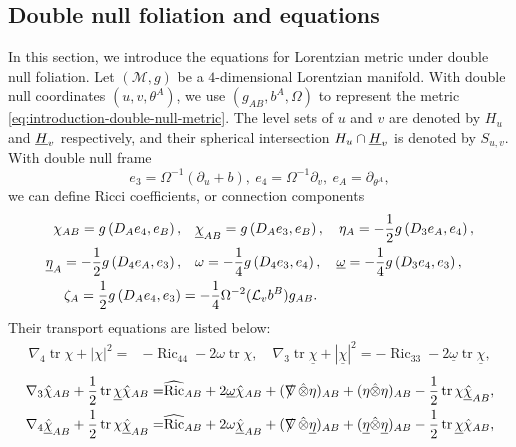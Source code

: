 \subsection{Double null foliation and equations}
In this section, we introduce the equations for Lorentzian metric under double null foliation. Let $(\mathcal{M},g)$ be a $4$-dimensional Lorentzian manifold. With double null coordinates $(u,v,\theta^A)$, we use $(g_{AB},b^A,\Omega)$ to represent the metric \eqref{eq:introduction-double-null-metric}. The level sets of $u$ and $v$ are denoted by $H_u$ and $\underline H_{v}$ respectively, and their spherical intersection $H_u\cap\underline H_v$ is denoted by $S_{u,v}$.
With double null frame 
\[e_3=\Omega^{-1}(\partial_u+b),\ e_4=\Omega^{-1}\partial_v,\ e_A=\partial_{\theta^A},\]
we can define Ricci coefficients, or connection components
\begin{equation}\label{Ricci_coefficients_definition}
    \begin{aligned}
    \chi_{A B}=g\left(D_A e_4, e_B\right), &\quad \underline{\chi}_{A B}=g\left(D_A e_3, e_B\right), \quad
    \eta_A=-\frac{1}{2} g\left(D_3 e_A, e_4\right),\\
    \underline{\eta}_A=-\frac{1}{2} g\left(D_4 e_A, e_3\right),&\quad 
    {\omega}=-\frac{1}{4} g\left(D_4 e_3, e_4\right), \quad \underline{\omega}=-\frac{1}{4} g\left(D_3 e_4, e_3\right),\\
    \zeta_A=\frac{1}{2}g\left(D_A e_4,e_3\right)&=-\frac{1}{4}\Omega^{-2}(\mathcal L_vb^B)g_{AB}.
    \end{aligned}
\end{equation}
Their transport equations are listed below:
\begin{equation}\label{eq:Ricci_coefficients_propagation_1}
    \begin{aligned}
        \nabla_4 \operatorname{tr} \chi+|{\chi}|^2 =&-\operatorname{Ric}_{44}-2 \omega \operatorname{tr} \chi, \quad 
     \nabla_3 \operatorname{tr} \underline{\chi}+|\underline{{\chi}}|^2 =-\operatorname{Ric}_{33}-2 \underline{\omega} \operatorname{tr} \underline{\chi},
    \end{aligned}
\end{equation}
\begin{equation}\label{eq:Ricci_coefficients_propagation_2}
    \begin{aligned}
        \nabla_3 \hat{\chi}_{A B}+\frac{1}{2} \operatorname{tr} \underline{\chi} \hat{\chi}_{A B}=&\widehat{\operatorname{Ric}}_{A B}+2 \underline{\omega} \hat{\chi}_{A B}+(\nabla\mkern-13mu /\,\,  \hat{\otimes} \eta)_{A B}+(\eta \hat{\otimes} \eta)_{A B}-\frac{1}{2} \operatorname{tr} \chi \underline{\hat{\chi}}_{A B}, \\
     \nabla_4 \underline{\hat{\chi}}_{A B}+\frac{1}{2} \operatorname{tr} \chi \underline{\hat{\chi}}_{A B}=&\widehat{\operatorname{Ric}}_{A B}+2 \omega \underline{\hat{\chi}}_{A B}+(\nabla\mkern-13mu /\,\,\hat{\otimes} \underline{\eta})_{A B}+(\underline{\eta} {\hat{\otimes}} \underline{\eta})_{A B}-\frac{1}{2} \operatorname{tr} \underline{\chi} \hat{\chi}_{A B},
    \end{aligned}
\end{equation}

